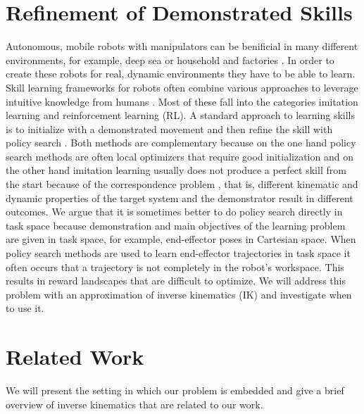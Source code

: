 \documentclass{svproc}
\begin{document}
\section{Refinement of Demonstrated Skills}
Autonomous, mobile robots with manipulators can be benificial in many
different environments, for example, deep sea \cite{Hildebrandt2008} or
household and factories \cite{Lemburg2011}.
In order to create these robots for real, dynamic environments they have
to be able to learn.
Skill learning frameworks for robots often combine various approaches to
leverage intuitive knowledge from humans \cite{Gutzeit2018}. %
Most of these fall into the categories imitation learning and reinforcement
learning (RL). A standard approach to learning skills is to initialize with
a demonstrated movement and then refine the skill with policy search
\cite{Kober2012,Deisenroth2013,Gutzeit2018}.
Both methods are complementary because on the one hand policy search methods
are often local optimizers that require good initialization and
on the other hand imitation learning usually does not produce a perfect
skill from the start because of the correspondence problem \cite{Gutzeit2018},
that is, different kinematic and dynamic properties of the target system and
the demonstrator result in different outcomes.
We argue that it is sometimes better to do policy search directly in task
space because demonstration and main objectives of the learning problem are
given in task space, for example, end-effector poses in Cartesian space.
When policy search methods are used to learn end-effector
trajectories in task space it often occurs that a trajectory is not
completely in the robot's workspace.
This results in reward landscapes that are difficult to optimize.
We will address this problem with an approximation of inverse kinematics (IK)
and investigate when to use it.

\section{Related Work}
We will present the setting in which our problem is embedded
and give a brief overview of inverse kinematics that are related
to our work.
\end{document}
